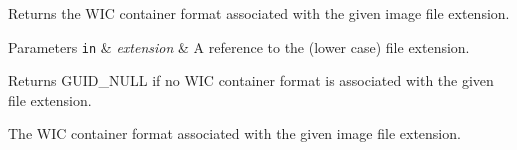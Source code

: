 Returns the W\+IC container format associated with the given image file extension.


\begin{DoxyParams}[1]{Parameters}
\mbox{\tt in}  & {\em extension} & A reference to the (lower case) file extension. \\
\hline
\end{DoxyParams}
\begin{DoxyReturn}{Returns}
{\ttfamily G\+U\+I\+D\+\_\+\+N\+U\+LL} if no W\+IC container format is associated with the given file extension. 

The W\+IC container format associated with the given image file extension. 
\end{DoxyReturn}
